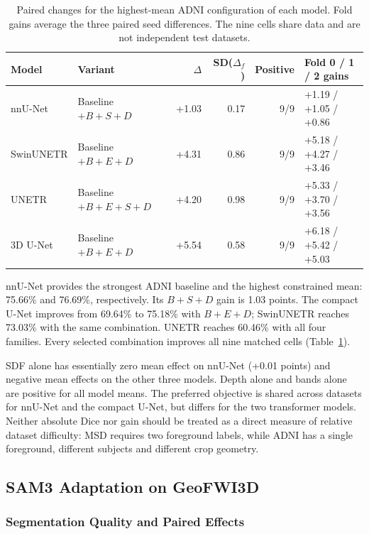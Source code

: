 \documentclass[12pt,a4paper]{article}
\begin{document}
\begin{table}[htbp]
\centering\footnotesize{}
\setlength{\tabcolsep}{5pt}
\renewcommand{\arraystretch}{1.15}
\begin{tabular}{@{}llrrrl@{}}
\hline
Model & Variant & $\Delta$ & SD($\Delta_f$) & Positive & Fold 0 / 1 / 2 gains \\
\hline
nnU-Net & Baseline $+B+S+D$ & +1.03 & 0.17 & 9/9 & +1.19 / +1.05 / +0.86 \\
SwinUNETR & Baseline $+B+E+D$ & +4.31 & 0.86 & 9/9 & +5.18 / +4.27 / +3.46 \\
UNETR & Baseline $+B+E+S+D$ & +4.20 & 0.98 & 9/9 & +5.33 / +3.70 / +3.56 \\
3D U-Net & Baseline $+B+E+D$ & +5.54 & 0.58 & 9/9 & +6.18 / +5.42 / +5.03 \\
\hline
\end{tabular}
\caption{Paired changes for the highest-mean ADNI configuration of each model. Fold gains average the three paired seed differences. The nine cells share data and are not independent test datasets.}
\label{tab:adni-noaug-best}
\end{table}

nnU-Net provides the strongest ADNI baseline and the highest constrained
mean: 75.66\% and 76.69\%, respectively. Its $B+S+D$ gain is 1.03
points. The compact U-Net improves from 69.64\% to 75.18\% with
$B+E+D$; SwinUNETR reaches 73.03\% with the same combination. UNETR
reaches 60.46\% with all four families. Every selected combination
improves all nine matched cells (Table~\ref{tab:adni-noaug-best}).

SDF alone has essentially zero mean effect on nnU-Net (+0.01 points)
and negative mean effects on the other three models. Depth alone and
bands alone are positive for all model means. The preferred objective
is shared across datasets for nnU-Net and the compact U-Net, but differs
for the two transformer models. Neither absolute Dice nor gain should
be treated as a direct measure of relative dataset difficulty: MSD
requires two foreground labels, while ADNI has a single foreground,
different subjects and different crop geometry.


\FloatBarrier
\subsection{SAM3 Adaptation on GeoFWI3D}
\label{sec:sam3-results}

\subsubsection{Segmentation Quality and Paired Effects}
\end{document}
